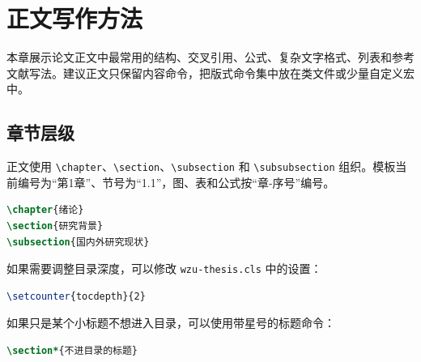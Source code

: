 \chapter{正文写作方法}

本章展示论文正文中最常用的结构、交叉引用、公式、复杂文字格式、列表和参考文献写法。建议正文只保留内容命令，把版式命令集中放在类文件或少量自定义宏中。

\section{章节层级}

正文使用 \verb|\chapter|、\verb|\section|、\verb|\subsection| 和 \verb|\subsubsection| 组织。模板当前编号为“第1章”、节号为“1.1”，图、表和公式按“章-序号”编号。

\begin{lstlisting}[language=TeX]
\chapter{绪论}
\section{研究背景}
\subsection{国内外研究现状}
\end{lstlisting}

如果需要调整目录深度，可以修改 \texttt{wzu-thesis.cls} 中的设置：

\begin{lstlisting}[language=TeX]
\setcounter{tocdepth}{2}
\end{lstlisting}

如果只是某个小标题不想进入目录，可以使用带星号的标题命令：

\begin{lstlisting}[language=TeX]
\section*{不进目录的标题}
\end{lstlisting}

